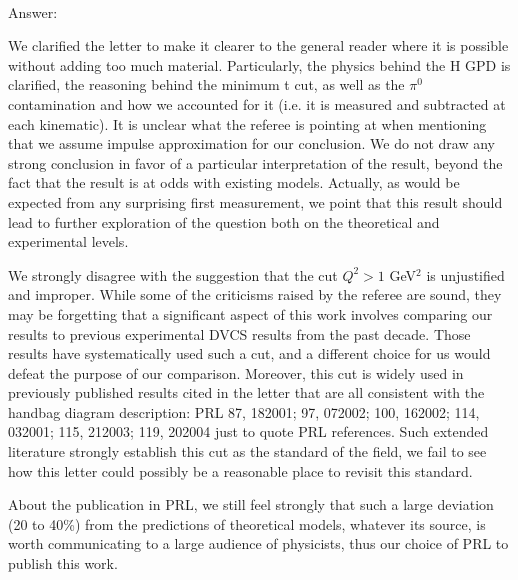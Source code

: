 \documentclass{article}
\begin{document}
\noindent \\
Answer:

We clarified the letter to make it clearer to the general reader where it is possible without adding too much material. Particularly, the physics behind the H GPD is clarified, the reasoning behind the minimum t cut, as well as the $\pi^0$ contamination and how we accounted for it (i.e. it is measured and subtracted at each kinematic). It is unclear what the referee is pointing at when mentioning that we assume impulse approximation for our conclusion. We do not draw any strong conclusion in favor of a particular interpretation of the result, beyond the fact that the result is at odds with existing models. Actually, as would be expected from any surprising first measurement, we point that this result should lead to further exploration of the question both on the theoretical and experimental levels. 

We strongly disagree with the suggestion that the cut $Q^2 > 1$ GeV$^2$ is unjustified and improper. While some of the criticisms raised by the referee are sound, they may be forgetting that a significant aspect of this work involves comparing our results to previous experimental DVCS results from the past decade. Those results have systematically used such a cut, and a different choice for us would defeat the purpose of our comparison. Moreover, this cut is widely used in previously published results cited in the letter that are all consistent with the handbag diagram description: PRL 87, 182001; 97, 072002; 100, 162002; 114, 032001; 115, 212003; 119, 202004 just to quote PRL references. Such extended literature strongly establish this cut as the standard of the field, we fail to see how this letter could possibly be a reasonable place to revisit this standard. 

About the publication in PRL, we still feel strongly that such a large deviation (20 to 40\%) from the predictions of theoretical models, whatever its source, is worth communicating to a large audience of physicists, thus our choice of PRL to publish this work.
\end{document}
